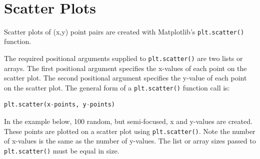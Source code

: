 \documentclass{book}
\begin{document}
    \begin{center}
    \end{center}
    { \hspace*{\fill} \\}
    

    
        \section{Scatter Plots}\label{scatter-plots}
    




    
        Scatter plots of (x,y) point pairs are created with Matplotlib's
\lstinline!plt.scatter()! function.

The required positional arguments supplied to \lstinline!plt.scatter()!
are two lists or arrays. The first positional argument specifies the
x-values of each point on the scatter plot. The second positional
argument specifies the y-value of each point on the scatter plot. The
general form of a \lstinline!plt.scatter()! function call is:

\begin{lstlisting}[language=Python]
plt.scatter(x-points, y-points)
\end{lstlisting}

In the example below, 100 random, but semi-focused, x and y-values are
created. These points are plotted on a scatter plot using
\lstinline!plt.scatter()!. Note the number of x-values is the same as
the number of y-values. The list or array sizes passed to
\lstinline!plt.scatter()! must be equal in size.
    
\end{document}
